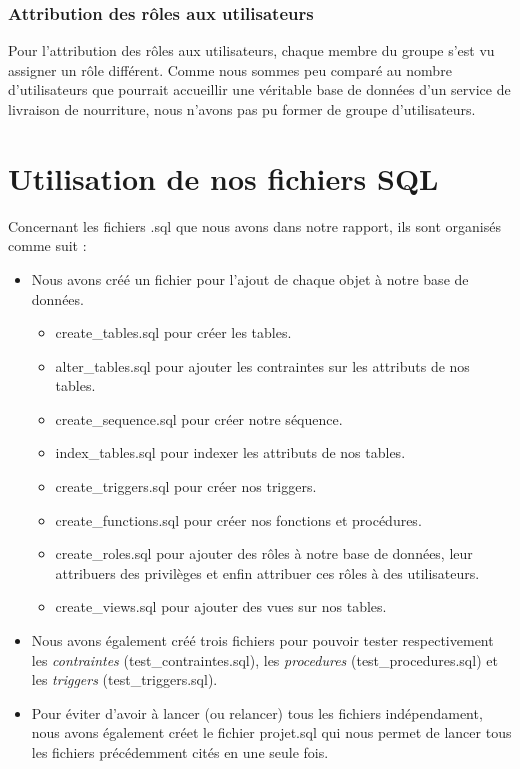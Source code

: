 \documentclass[french]{article}
\begin{document}
            \subsubsection*{Attribution des rôles aux utilisateurs}
                Pour l'attribution des rôles aux utilisateurs, chaque membre du groupe s'est vu assigner un rôle différent. Comme nous sommes peu comparé au nombre d'utilisateurs que pourrait accueillir une véritable base de données d'un service de livraison de nourriture, nous n'avons pas pu former de groupe d'utilisateurs.

    \section{Utilisation de nos fichiers SQL}

        Concernant les fichiers .sql que nous avons dans notre rapport, ils sont organisés comme suit :
        \begin{itemize}
            \item Nous avons créé un fichier pour l'ajout de chaque objet à notre base de données. 
            \begin{itemize}
                \item create\_tables.sql pour créer les tables.
                \item alter\_tables.sql pour ajouter les contraintes sur les attributs de nos tables.
                \item create\_sequence.sql pour créer notre séquence.
                \item index\_tables.sql pour indexer les attributs de nos tables.
                \item create\_triggers.sql pour créer nos triggers.
                \item create\_functions.sql pour créer nos fonctions et procédures.
                \item create\_roles.sql pour ajouter des rôles à notre base de données, leur attribuers des privilèges et enfin attribuer ces rôles à des utilisateurs.
                \item create\_views.sql pour ajouter des vues sur nos tables.
            \end{itemize}
            \item Nous avons également créé trois fichiers pour pouvoir tester respectivement les \textit{contraintes} (test\_contraintes.sql), les \textit{procedures} (test\_procedures.sql) et les \textit{triggers} (test\_triggers.sql).
            \item Pour éviter d'avoir à lancer (ou relancer) tous les fichiers indépendament, nous avons également créet le fichier projet.sql qui nous permet de lancer tous les fichiers précédemment cités en une seule fois.
        \end{itemize} 
\end{document}
